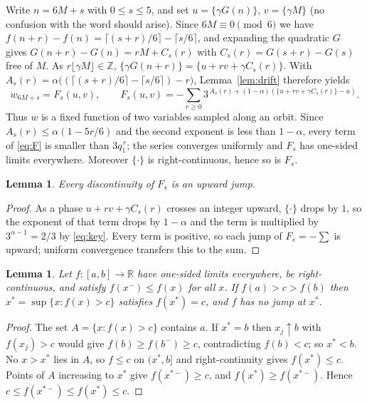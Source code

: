 \documentclass[11pt,a4paper]{article}
\theoremstyle{plain}
\newtheorem{lemma}[theorem]{Lemma}
\theoremstyle{definition}
\newcommand{\R}{\mathbb{R}}
\newcommand{\Z}{\mathbb{Z}}
\newcommand{\al}{\alpha}
\newcommand{\ga}{\gamma}
\newcommand{\fr}[1]{\{#1\}}
\begin{document}
Write $n=6M+s$ with $0\le s\le5$, and set $u=\fr{\ga G(n)}$, $v=\fr{\ga M}$ (no confusion with the
word should arise). Since $6M\equiv0\pmod 6$ we have
$f(n+r)-f(n)=\lceil(s+r)/6\rceil-\lceil s/6\rceil$, and expanding the quadratic $G$ gives
$G(n+r)-G(n)=rM+C_s(r)$ with $C_s(r)=G(s+r)-G(s)$ free of $M$. As $r\lfloor\ga M\rfloor\in\Z$,
$\fr{\ga G(n+r)}=\fr{u+rv+\ga C_s(r)}$. With
$A_s(r)=\al\big((\lceil(s+r)/6\rceil-\lceil s/6\rceil)-r\big)$, Lemma~\ref{lem:drift} therefore
yields
\begin{equation}\label{eq:F}
  w_{6M+s}=F_s(u,v),\qquad
  F_s(u,v)=-\sum_{r\ge0}3^{\,A_s(r)+(1-\al)(\fr{u+rv+\ga C_s(r)}-u)} .
\end{equation}
Thus $w$ is a fixed function of two variables sampled along an orbit. Since
$A_s(r)\le\al(1-5r/6)$ and the second exponent is less than $1-\al$, every term of \eqref{eq:F} is
smaller than $3q_1^{\,r}$; the series converges uniformly and $F_s$ has one-sided limits everywhere.
Moreover $\fr\cdot$ is right-continuous, hence so is $F_s$.

\begin{lemma}\label{lem:up}
Every discontinuity of $F_s$ is an upward jump.
\end{lemma}

\begin{proof}
As a phase $u+rv+\ga C_s(r)$ crosses an integer upward, $\fr\cdot$ drops by $1$, so the exponent of
that term drops by $1-\al$ and the term is multiplied by $3^{\al-1}=2/3$ by \eqref{eq:key}. Every
term is positive, so each jump of $F_s=-\sum$ is upward; uniform convergence transfers this to the
sum.
\end{proof}

\begin{lemma}\label{lem:cross}
Let $f:[a,b]\to\R$ have one-sided limits everywhere, be right-continuous, and satisfy
$f(x^-)\le f(x)$ for all $x$. If $f(a)>c>f(b)$ then $x^*=\sup\{x:f(x)>c\}$ satisfies $f(x^*)=c$, and
$f$ has no jump at $x^*$.
\end{lemma}

\begin{proof}
The set $A=\{x:f(x)>c\}$ contains $a$. If $x^*=b$ then $x_j\uparrow b$ with $f(x_j)>c$ would give
$f(b)\ge f(b^-)\ge c$, contradicting $f(b)<c$; so $x^*<b$. No $x>x^*$ lies in $A$, so $f\le c$ on
$(x^*,b]$ and right-continuity gives $f(x^*)\le c$. Points of $A$ increasing to $x^*$ give
$f(x^{*-})\ge c$, and $f(x^*)\ge f(x^{*-})$. Hence $c\le f(x^{*-})\le f(x^*)\le c$.
\end{proof}
\end{document}

